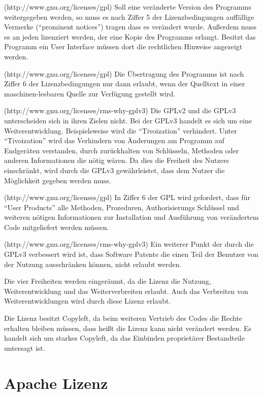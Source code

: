 (http://www.gnu.org/licenses/gpl) Soll eine ver\"anderte Version des Programms weitergegeben werden, so muss es nach Ziffer 5 der Lizenzbedingungen auff\"allige Vermerke (“prominent notices”) tragen dass es ver\"andert wurde. Außerdem muss es an jeden lizenziert werden, der eine Kopie des Programms erlangt. Besitzt das Programm ein User Interface m\"ussen dort die rechtlichen Hinweise angezeigt werden.

(http://www.gnu.org/licenses/gpl) Die \"Ubertragung des Programms ist nach Ziffer 6 der Lizenzbedingungen nur dann erlaubt, wenn der Quelltext in einer maschinen-lesbaren Quelle zur Verf\"ugung gestellt wird. 

(http://www.gnu.org/licenses/rms-why-gplv3) Die GPLv2 und die GPLv3 unterscheiden sich in ihren Zielen nicht. Bei der GPLv3 handelt es sich um eine Weiterentwicklung. Beispielsweise wird die “Tivoization” verhindert. Unter “Tivoization” wird das Verhindern von \"Anderungen am Programm auf Endger\"aten verstanden, durch zur\"uckhalten von Schl\"usseln, Methoden oder anderen Informationen die n\"otig w\"aren. Da dies die Freiheit des Nutzers einschr\"ankt, wird durch die GPLv3 gew\"ahrleistet, dass dem Nutzer die M\"oglichkeit gegeben werden muss. 

(http://www.gnu.org/licenses/gpl) In Ziffer 6 der GPL wird gefordert, dass f\"ur “User Products” alle Methoden, Prozeduren, Authorisierungs Schl\"ussel und weiteren n\"otigen Informationen zur Installation und Ausf\"uhrung von ver\"andertem Code mitgeliefert werden m\"ussen. 

(http://www.gnu.org/licenses/rms-why-gplv3) Ein weiterer Punkt der durch die GPLv3 verbessert wird ist, dass Software Patente die einen Teil der Benutzer von der Nutzung ausschr\"anken k\"onnen, nicht erlaubt werden. 

Die vier Freiheiten werden einger\"aumt, da die Lizenz die Nutzung, Weiterentwicklung und das Weiterverbreiten erlaubt. Auch das Verbreiten von Weiterentwicklungen wird durch diese Lizenz erlaubt.

Die Lizenz besitzt Copyleft, da beim weiteren Vertrieb des Codes die Rechte erhalten bleiben m\"ussen, dass heißt die Lizenz kann nicht ver\"andert werden. Es handelt sich um starkes Copyleft, da das Einbinden propriet\"arer Bestandteile untersagt ist. 

\section{Apache Lizenz}


